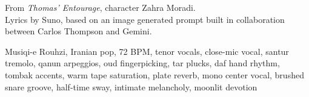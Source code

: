 
\begin{notes}
From \emph{Thomas’ Entourage}, character Zahra Moradi.\\
Lyrics by Suno, based on an image generated prompt built in collaboration between Carlos Thompson and Gemini.
\end{notes}
\begin{style}
Musiqi-e Rouhzi, Iranian pop, 72 BPM, tenor vocals, close-mic vocal, santur tremolo, qanun arpeggios, oud fingerpicking, tar plucks, daf hand rhythm, tombak accents, warm tape saturation, plate reverb, mono center vocal, brushed snare groove, half-time sway, intimate melancholy, moonlit devotion
\end{style}

